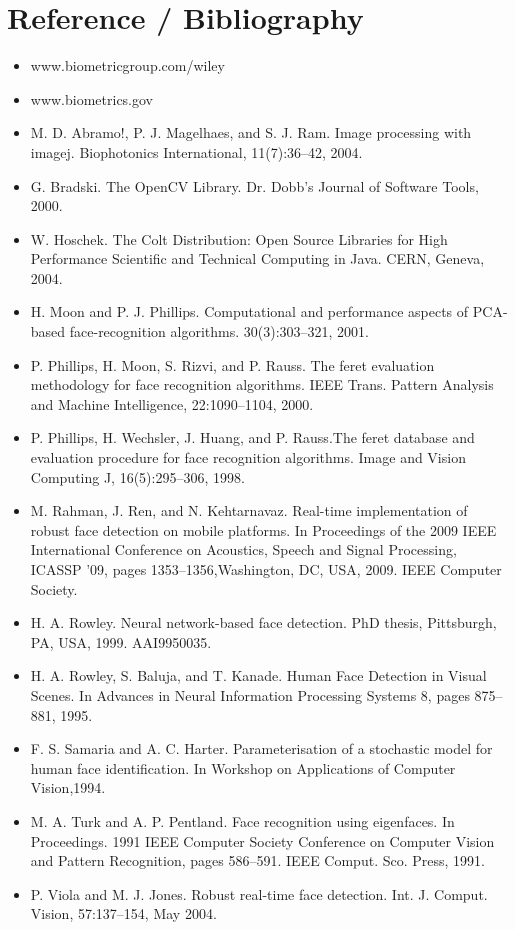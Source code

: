 \documentclass[a4paper,12pt]{article}
\begin{document}
\section{Reference / Bibliography}
\begin{itemize}
\item www.biometricgroup.com/wiley
\item www.biometrics.gov
\item M. D. Abramo!, P. J. Magelhaes, and S. J. Ram. Image processing with imagej. Biophotonics International, 11(7):36–42, 2004.

\item G. Bradski. The OpenCV Library. Dr. Dobb’s Journal of Software Tools, 2000.

\item  W. Hoschek. The Colt Distribution: Open Source Libraries for High Performance Scientific and Technical Computing in Java. CERN, Geneva, 2004.

\item  H. Moon and P. J. Phillips. Computational and performance aspects of PCA-based face-recognition algorithms. 30(3):303–321, 2001.

\item  P. Phillips, H. Moon, S. Rizvi, and P. Rauss. The feret evaluation methodology for face recognition algorithms. IEEE Trans. Pattern Analysis and Machine Intelligence, 22:1090–1104, 2000.

\item  P. Phillips, H. Wechsler, J. Huang, and P. Rauss.The feret database and evaluation procedure for face recognition algorithms. Image and Vision Computing J, 16(5):295–306, 1998.

\item  M. Rahman, J. Ren, and N. Kehtarnavaz. Real-time implementation of robust face detection on mobile platforms. In Proceedings of the 2009 IEEE International Conference on Acoustics, Speech and Signal Processing, ICASSP ’09, pages 1353–1356,Washington, DC, USA, 2009. IEEE Computer Society.
\item H. A. Rowley. Neural network-based face detection. PhD thesis, Pittsburgh, PA, USA, 1999. AAI9950035.

\item  H. A. Rowley, S. Baluja, and T. Kanade. Human Face Detection in Visual Scenes. In Advances in Neural Information Processing Systems 8, pages 875–881, 1995. 
\item F. S. Samaria and A. C. Harter. Parameterisation of a stochastic model for human face identification. In Workshop on Applications of Computer Vision,1994.

\item M. A. Turk and A. P. Pentland. Face recognition using eigenfaces. In Proceedings. 1991 IEEE Computer Society Conference on Computer Vision and Pattern Recognition, pages 586–591. IEEE Comput. Sco. Press, 1991.

\item  P. Viola and M. J. Jones. Robust real-time face detection. Int. J. Comput. Vision, 57:137–154, May 2004.
\end{itemize}
\end{document}
